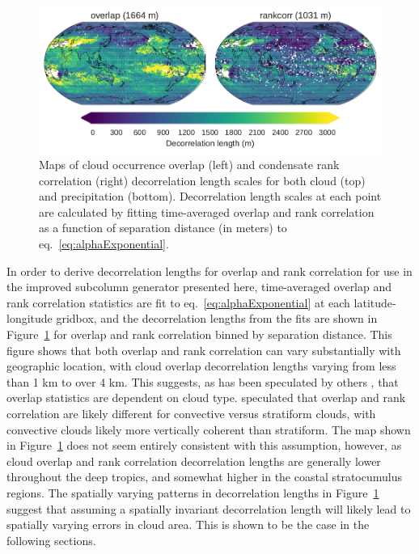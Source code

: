 \begin{figure}[htbp]
\centering
\includegraphics{graphics/subgrid2_overlap_maps.pdf}
\caption{\label{fig:overlapMaps}Maps of cloud occurrence overlap (left)
and condensate rank correlation (right) decorrelation length scales for
both cloud (top) and precipitation (bottom). Decorrelation length scales
at each point are calculated by fitting time-averaged overlap and rank
correlation as a function of separation distance (in meters) to
eq.~\ref{eq:alphaExponential}.}\label{fig:overlapMaps}
\end{figure}

In order to derive decorrelation lengths for overlap and rank
correlation for use in the improved subcolumn generator presented here,
time-averaged overlap and rank correlation statistics are fit to
eq.~\ref{eq:alphaExponential} at each latitude-longitude gridbox, and
the decorrelation lengths from the fits are shown in
Figure~\ref{fig:overlapMaps} for overlap and rank correlation binned by
separation distance. This figure shows that both overlap and rank
correlation can vary substantially with geographic location, with cloud
overlap decorrelation lengths varying from less than 1 km to over 4 km.
This suggests, as has been speculated by others \citep[
e.g.]{pincus_et_al_2005}, that overlap statistics are dependent on cloud
type. \citet{pincus_et_al_2005} speculated that overlap and rank
correlation are likely different for convective versus stratiform
clouds, with convective clouds likely more vertically coherent than
stratiform. The map shown in Figure~\ref{fig:overlapMaps} does not seem
entirely consistent with this assumption, however, as cloud overlap and
rank correlation decorrelation lengths are generally lower throughout
the deep tropics, and somewhat higher in the coastal stratocumulus
regions. The spatially varying patterns in decorrelation lengths in
Figure~\ref{fig:overlapMaps} suggest that assuming a spatially invariant
decorrelation length will likely lead to spatially varying errors in
cloud area. This is shown to be the case in the following sections.

